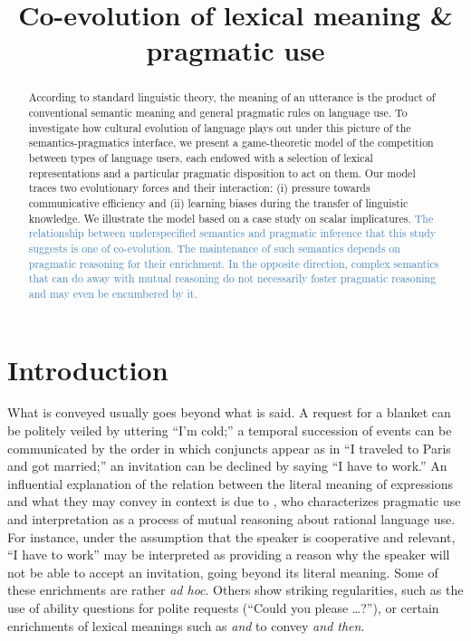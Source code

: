 \documentclass[a4paper, 11pt]{article}
\title{Co-evolution of lexical meaning \& pragmatic use}
\date{}
\theoremstyle{Satz}
\newcommand{\rvv}[1]{\textcolor{Steelblue}{#1}}%
\begin{document}

\maketitle

\begin{abstract}
 According to standard linguistic theory, the meaning of an utterance is the product of
  conventional semantic meaning and general pragmatic rules on language use. To investigate how
  cultural evolution of language plays out under this picture of the semantics-pragmatics
  interface, we present a game-theoretic model of the competition between types of language
  users, each endowed with a selection of lexical representations and a particular pragmatic
  disposition to act on them. Our model traces two evolutionary forces and their interaction:
  (i) pressure towards communicative efficiency and (ii) learning biases during the transfer of
  linguistic knowledge. We illustrate the model based on a case study on scalar
  implicatures. \rvv{The relationship between underspecified semantics and pragmatic inference that this study suggests is one of co-evolution. The maintenance of such semantics depends on pragmatic reasoning for their enrichment. In the opposite direction, complex semantics that can do away with mutual reasoning do not necessarily foster pragmatic reasoning and may even be encumbered by it.}
\end{abstract}

\section{Introduction}\label{sec:introduction}

What is conveyed usually goes beyond what is said. A request for a blanket can be politely
veiled by uttering ``I'm cold;'' a temporal succession of events can be communicated by the order
in which conjuncts appear as in ``I traveled to Paris and got married;'' an invitation can be
declined by saying ``I have to work.'' An influential explanation of the relation between the
literal meaning of expressions and what they may convey in context is due to
\citet{grice:1975}, who characterizes pragmatic use and interpretation as a process of mutual
reasoning about rational language use. For instance, under the assumption that the speaker is
cooperative and relevant, ``I have to work'' may be interpreted as providing a reason why the
speaker will not be able to accept an invitation, going beyond its literal meaning. Some of
these enrichments are rather \emph{ad hoc}. Others show striking regularities, such as the use
of ability questions for polite requests (``Could you please \dots?''), or certain enrichments
of lexical meanings such as \emph{and} to convey \emph{and then}.
\end{document}

